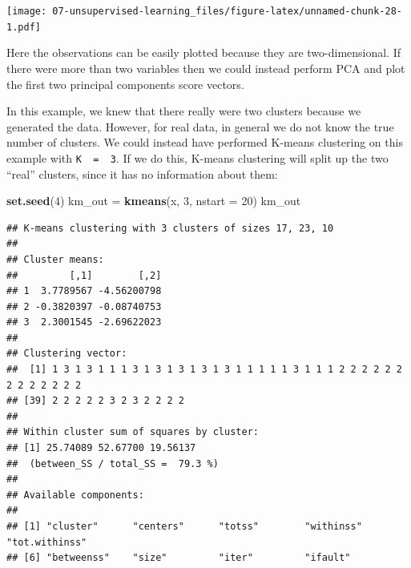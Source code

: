 \documentclass[
  openany]{book}
\newenvironment{Shaded}{\begin{snugshade}}{\end{snugshade}}
\newcommand{\DataTypeTok}[1]{\textcolor[rgb]{0.13,0.29,0.53}{#1}}
\newcommand{\DecValTok}[1]{\textcolor[rgb]{0.00,0.00,0.81}{#1}}
\newcommand{\KeywordTok}[1]{\textcolor[rgb]{0.13,0.29,0.53}{\textbf{#1}}}
\newcommand{\NormalTok}[1]{#1}
\newcommand{\OperatorTok}[1]{\textcolor[rgb]{0.81,0.36,0.00}{\textbf{#1}}}
\newcommand{\StringTok}[1]{\textcolor[rgb]{0.31,0.60,0.02}{#1}}
\begin{document}
\begin{Shaded}
\end{Shaded}

\texttt{[image: 07-unsupervised-learning\_files/figure-latex/unnamed-chunk-28-1.pdf]}

Here the observations can be easily plotted because they are two-dimensional.
If there were more than two variables then we could instead perform PCA
and plot the first two principal components score vectors.

In this example, we knew that there really were two clusters because
we generated the data. However, for real data, in general we do not know
the true number of clusters. We could instead have performed K-means
clustering on this example with \texttt{K\ \ =\ \ 3}. If we do this, K-means clustering will split up the two ``real'' clusters, since it has no information about them:

\begin{Shaded}
\begin{Highlighting}[]
\KeywordTok{set.seed}\NormalTok{(}\DecValTok{4}\NormalTok{)}
\NormalTok{km_out =}\StringTok{ }\KeywordTok{kmeans}\NormalTok{(x, }\DecValTok{3}\NormalTok{, }\DataTypeTok{nstart =} \DecValTok{20}\NormalTok{)}
\NormalTok{km_out}
\end{Highlighting}
\end{Shaded}

\begin{verbatim}
## K-means clustering with 3 clusters of sizes 17, 23, 10
## 
## Cluster means:
##         [,1]        [,2]
## 1  3.7789567 -4.56200798
## 2 -0.3820397 -0.08740753
## 3  2.3001545 -2.69622023
## 
## Clustering vector:
##  [1] 1 3 1 3 1 1 1 3 1 3 1 3 1 3 1 3 1 1 1 1 1 3 1 1 1 2 2 2 2 2 2 2 2 2 2 2 2 2
## [39] 2 2 2 2 2 3 2 3 2 2 2 2
## 
## Within cluster sum of squares by cluster:
## [1] 25.74089 52.67700 19.56137
##  (between_SS / total_SS =  79.3 %)
## 
## Available components:
## 
## [1] "cluster"      "centers"      "totss"        "withinss"     "tot.withinss"
## [6] "betweenss"    "size"         "iter"         "ifault"
\end{verbatim}
\end{document}
